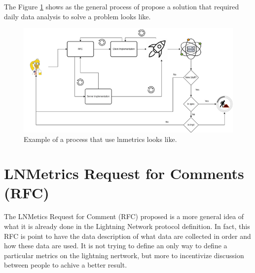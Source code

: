 The Figure \ref{fig:lnmetrics_process} shows as the general process of propose a solution that 
required daily data analysis to solve a problem looks like.

\begin{figure}
    \begin{center}
      \includegraphics[scale=0.7]{imgs/lnmetrics-workflow-drawio.png}
    \end{center}
    \caption{Example of a process that use lnmetrics looks like.}
    \label{fig:lnmetrics_process}
\end{figure}


\section{LNMetrics Request for Comments (RFC)}

The LNMetics Request for Comment (RFC) proposed is a more general idea of what 
it is already done in the Lightning Network protocol definition. In fact,
this RFC is point to have the data description of what data are collected in 
order and how these data are used. It is not trying to define an only way to 
define a particular metrics on the lightning nertwork, but more to incentivize
discussion between people to achive a better result.
